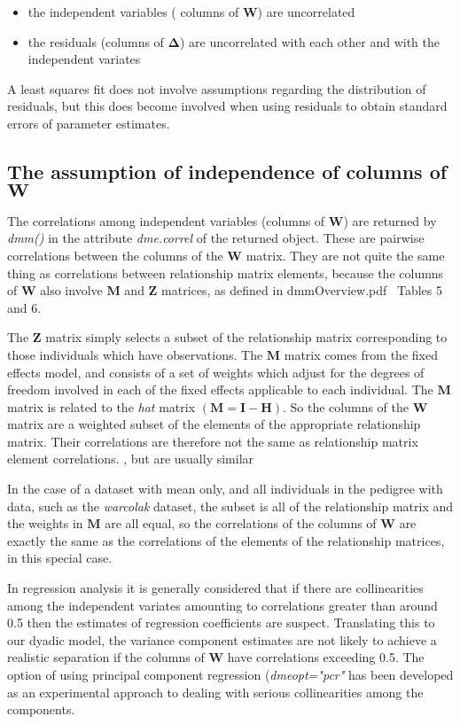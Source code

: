 \documentclass[titlepage]{article}  %
\begin{document}
\begin{itemize}
\item the independent variables ( columns of $\bm{W}$) are uncorrelated
\item the residuals (columns of $\bm{\Delta}$) are uncorrelated with each other and with the independent variates
\end{itemize}

A least squares fit does not involve assumptions regarding the distribution of residuals, but this does become involved when using residuals to obtain standard errors of parameter estimates.

\subsection{The assumption of independence of columns of $\bm{W}$}

The correlations among independent variables (columns of $\bm{W}$) are returned by {\em dmm()} in the attribute {\em dme.correl} of the returned object.  These are pairwise correlations between the columns of the $\bm{W}$ matrix. They are not quite the same thing as correlations between relationship matrix elements, because the columns of $\bm{W}$ also involve $\bm{M}$ and $\bm{Z}$ matrices, as defined in dmmOverview.pdf~\cite{jack:15} Tables 5 and 6.

The $\bm{Z}$ matrix simply selects a subset of the relationship matrix corresponding to those individuals which have observations. The $\bm{M}$ matrix comes from the fixed effects model, and consists of a set of weights which adjust for the degrees of freedom involved in each of the fixed effects applicable to each individual. The $\bm{M}$ matrix is related to the {\em hat} matrix $(\bm{M} = \bm{I} - \bm{H})$. So the columns of the $\bm{W}$ matrix are a weighted subset of the elements of the appropriate relationship matrix. Their correlations are therefore not the same as relationship matrix element correlations.
, but are usually similar

In the case of a dataset with mean only, and all individuals in the pedigree with data, such as the {\em warcolak} dataset, the subset is all of the relationship matrix and the weights in $\bm{M}$ are all equal, so the correlations of the columns of $\bm{W}$ are exactly the same as the correlations of the elements of the relationship matrices, in this special case.

In regression analysis it is generally considered that if there are collinearities among the independent variates amounting to correlations greater than around 0.5 then the estimates of regression coefficients are suspect. Translating this to our dyadic model, the variance component estimates are not likely to achieve a realistic separation if the columns of $\bm{W}$ have correlations exceeding 0.5. The option of using principal component regression ({\em dmeopt="pcr"} has been developed as an experimental approach to dealing with serious collinearities among the components.
\end{document}
